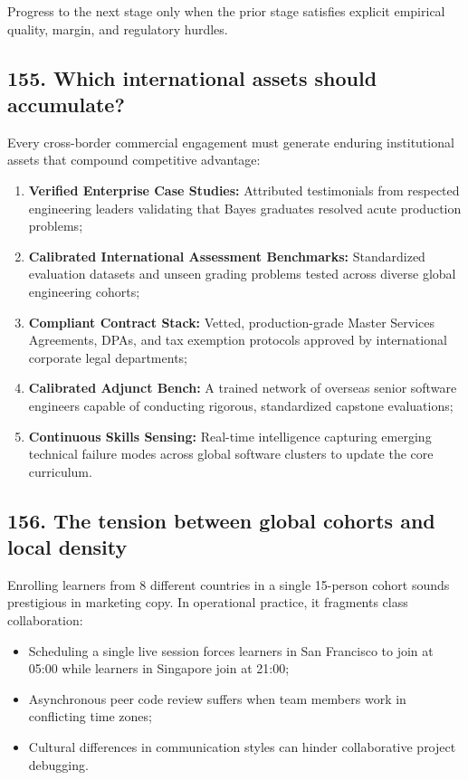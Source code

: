 Progress to the next stage only when the prior stage satisfies explicit empirical quality, margin, and regulatory hurdles.

\subsection{155. Which international assets should accumulate?}

Every cross-border commercial engagement must generate enduring institutional assets that compound competitive advantage:
\begin{enumerate}
    \item \textbf{Verified Enterprise Case Studies:} Attributed testimonials from respected engineering leaders validating that Bayes graduates resolved acute production problems;
    \item \textbf{Calibrated International Assessment Benchmarks:} Standardized evaluation datasets and unseen grading problems tested across diverse global engineering cohorts;
    \item \textbf{Compliant Contract Stack:} Vetted, production-grade Master Services Agreements, DPAs, and tax exemption protocols approved by international corporate legal departments;
    \item \textbf{Calibrated Adjunct Bench:} A trained network of overseas senior software engineers capable of conducting rigorous, standardized capstone evaluations;
    \item \textbf{Continuous Skills Sensing:} Real-time intelligence capturing emerging technical failure modes across global software clusters to update the core curriculum.
\end{enumerate}

\subsection{156. The tension between global cohorts and local density}

Enrolling learners from 8 different countries in a single 15-person cohort sounds prestigious in marketing copy. In operational practice, it fragments class collaboration:
\begin{itemize}
    \item Scheduling a single live session forces learners in San Francisco to join at 05:00 while learners in Singapore join at 21:00;
    \item Asynchronous peer code review suffers when team members work in conflicting time zones;
    \item Cultural differences in communication styles can hinder collaborative project debugging.
\end{itemize}

